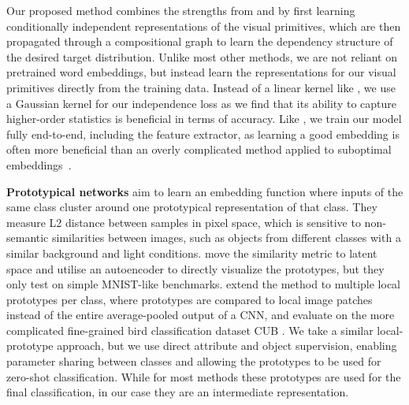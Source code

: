 \documentclass{article}
\begin{document}
Our proposed method combines the strengths from \citet{atzmon2020causal} and \citet{naeem2021learning} by first learning conditionally independent representations of the visual primitives, which are then propagated through a compositional graph to learn the dependency structure of the desired target distribution. Unlike most other methods, we are not reliant on pretrained word embeddings, but instead learn the representations for our visual primitives directly from the training data. Instead of a linear kernel like \citet{atzmon2020causal}, we use a Gaussian kernel for our independence loss as we find that its ability to capture higher-order statistics is beneficial in terms of accuracy. Like \citet{naeem2021learning}, we train our model fully end-to-end, including the feature extractor, as learning a good embedding is often more beneficial than an overly complicated method applied to suboptimal embeddings~\citep{tian2020rethinking}.

\textbf{Prototypical networks} \citep{snell2017prototypical} aim to learn an embedding function where inputs of the same class cluster around one prototypical representation of that class. They measure L2 distance between samples in pixel space, which is sensitive to non-semantic similarities between images, such as objects from different classes with a similar background and light conditions. \citet{li2018deep} move the similarity metric to latent space and utilise an autoencoder to directly visualize the prototypes, but they only test on simple MNIST-like benchmarks. \citet{chen2019looks} extend the method to multiple local prototypes per class, where prototypes are compared to local image patches instead of the entire average-pooled output of a CNN, and evaluate on the more complicated fine-grained bird classification dataset CUB \citep{WahCUB_200_2011}. We take a similar local-prototype approach, but we use direct attribute and object supervision, enabling parameter sharing between classes and allowing the prototypes to be used for zero-shot classification. While for most methods these prototypes are used for the final classification, in our case they are an intermediate representation.
\end{document}
